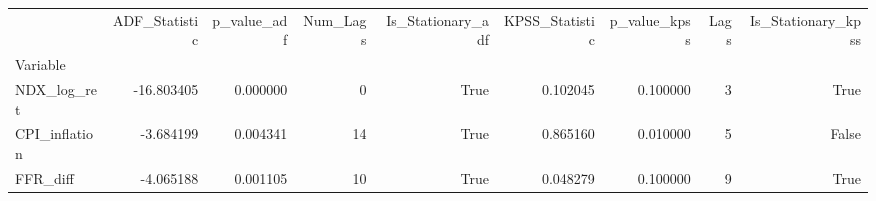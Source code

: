 \begin{tabular}{lrrrrrrrr}
\toprule
 & ADF_Statistic & p_value_adf & Num_Lags & Is_Stationary_adf & KPSS_Statistic & p_value_kpss & Lags & Is_Stationary_kpss \\
Variable &  &  &  &  &  &  &  &  \\
\midrule
NDX_log_ret & -16.803405 & 0.000000 & 0 & True & 0.102045 & 0.100000 & 3 & True \\
CPI_inflation & -3.684199 & 0.004341 & 14 & True & 0.865160 & 0.010000 & 5 & False \\
FFR_diff & -4.065188 & 0.001105 & 10 & True & 0.048279 & 0.100000 & 9 & True \\
\bottomrule
\end{tabular}
